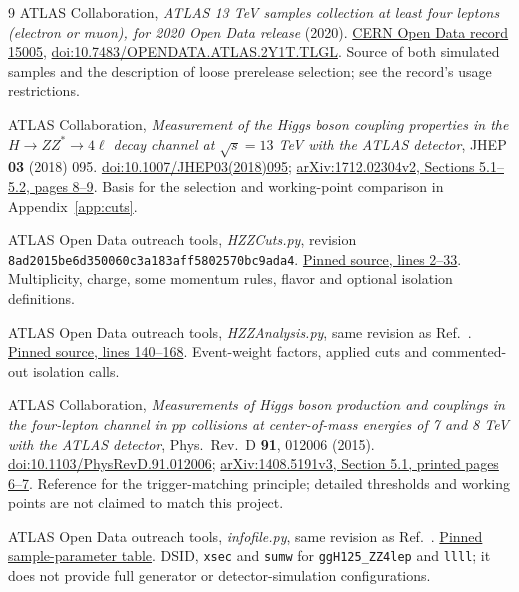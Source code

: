 \documentclass[11pt,a4paper]{article}
\begin{document}
\begingroup
\small
\renewcommand{\refname}{References for this report}
\begin{thebibliography}{9}
ATLAS Collaboration, \emph{ATLAS 13 TeV samples collection at least four leptons
(electron or muon), for 2020 Open Data release} (2020).
\href{https://opendata.cern.ch/record/15005}{CERN Open Data record 15005},
\href{https://doi.org/10.7483/OPENDATA.ATLAS.2Y1T.TLGL}{doi:10.7483/OPENDATA.ATLAS.2Y1T.TLGL}.
Source of both simulated samples and the description of loose prerelease selection; see the record's usage restrictions.

ATLAS Collaboration, \emph{Measurement of the Higgs boson coupling properties in
the $H\to ZZ^*\to4\ell$ decay channel at $\sqrt{s}=13$ TeV with the ATLAS detector},
JHEP \textbf{03} (2018) 095.
\href{https://doi.org/10.1007/JHEP03(2018)095}{doi:10.1007/JHEP03(2018)095};
\href{https://arxiv.org/pdf/1712.02304v2#page=8}{arXiv:1712.02304v2, Sections 5.1--5.2, pages 8--9}.
Basis for the selection and working-point comparison in Appendix~\ref{app:cuts}.

ATLAS Open Data outreach tools, \emph{HZZCuts.py}, revision
\nolinkurl{8ad2015be6d350060c3a183aff5802570bc9ada4}.
\href{https://github.com/atlas-outreach-data-tools/atlas-outreach-Python-uproot-framework-13tev/blob/8ad2015be6d350060c3a183aff5802570bc9ada4/HZZCuts.py#L2-L33}{Pinned source, lines 2--33}.
Multiplicity, charge, some momentum rules, flavor and optional isolation definitions.

ATLAS Open Data outreach tools, \emph{HZZAnalysis.py}, same revision as Ref.~\cite{HZZCuts}.
\href{https://github.com/atlas-outreach-data-tools/atlas-outreach-Python-uproot-framework-13tev/blob/8ad2015be6d350060c3a183aff5802570bc9ada4/HZZAnalysis.py#L140-L168}{Pinned source, lines 140--168}.
Event-weight factors, applied cuts and commented-out isolation calls.

ATLAS Collaboration, \emph{Measurements of Higgs boson production and couplings
in the four-lepton channel in $pp$ collisions at center-of-mass energies of
7 and 8 TeV with the ATLAS detector}, Phys.~Rev.~D \textbf{91}, 012006 (2015).
\href{https://doi.org/10.1103/PhysRevD.91.012006}{doi:10.1103/PhysRevD.91.012006};
\href{https://arxiv.org/pdf/1408.5191v3#page=7}{arXiv:1408.5191v3, Section 5.1, printed pages 6--7}.
Reference for the trigger-matching principle; detailed thresholds and working points are not claimed to match this project.

ATLAS Open Data outreach tools, \emph{infofile.py}, same revision as Ref.~\cite{HZZCuts}.
\href{https://github.com/atlas-outreach-data-tools/atlas-outreach-Python-uproot-framework-13tev/blob/8ad2015be6d350060c3a183aff5802570bc9ada4/infofile.py}{Pinned sample-parameter table}.
DSID, \texttt{xsec} and \texttt{sumw} for \texttt{ggH125\_ZZ4lep} and \texttt{llll}; it does not provide full generator or detector-simulation configurations.
\end{thebibliography}
\endgroup
\end{document}
